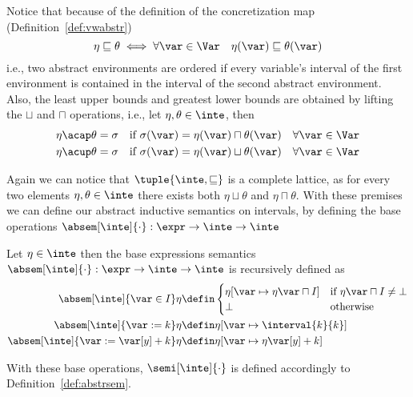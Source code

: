 Notice that because of the definition of the concretization map
(Definition~\ref{def:vwabstr})
\begin{equation*}
  \eta \sqsubseteq \theta \iff \forall \var \in \Var \quad \eta(\var) \sqsubseteq \theta(\var)
\end{equation*}
i.e., two abstract environments are ordered if every variable's
interval of the first environment is contained in the interval of the
second abstract environment.  Also, the least upper bounds and
greatest lower bounds are obtained by lifting the \(\sqcup\) and
\(\sqcap\) operations, i.e., let \(\eta, \theta \in \inte\), then
\begin{align*}
  \eta \acap \theta = \sigma & \quad \text{if } \sigma(\var) = \eta(\var) \sqcap \theta(\var) \quad \forall \var\in\Var \\
  \eta \acup \theta = \sigma & \quad \text{if } \sigma(\var) = \eta(\var) \sqcup \theta(\var) \quad \forall \var\in\Var
\end{align*}

Again we can notice that \(\tuple{\inte, \sqsubseteq}\) is a complete
lattice, as for every two elements \(\eta,\theta\in\inte\) there
exists both \(\eta \sqcup \theta\) and \(\eta \sqcap \theta\).  With
these premises we can define our abstract inductive semantics on
intervals, by defining the base operations
\(\absem[\inte]{\cdot} : \expr \to \inte \to \inte\)

\begin{definition}
  Let \(\eta \in \inte\) then the base expressions semantics
  \(\absem[\inte]{\cdot} : \expr \to \inte \to \inte\) is recursively
  defined as
  \begin{align*}
    \absem[\inte]{\var\in I}\eta & \defin
                                   \begin{cases}
                                     \eta[\var\mapsto\eta\var\sqcap I] & \text{if } \eta\var\sqcap I \neq \bot \\
                                     \bot & \text{otherwise}
                                   \end{cases} \\
    \absem[\inte]{\var := k}\eta & \defin \eta[\var\mapsto\interval{k}{k}] \\
    \absem[\inte]{\var := \var[y] + k}\eta & \defin \eta[\var\mapsto \eta\var[y] + k] \\
  \end{align*}
\end{definition}
With these base operations, \(\semi[\inte]{\cdot}\) is defined
accordingly to Definition~\ref{def:abstrsem}.
